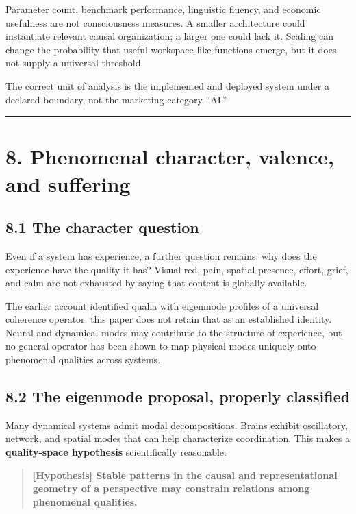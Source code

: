 \documentclass[
  11pt,
]{article}
\begin{document}
Parameter count, benchmark performance, linguistic fluency, and economic
usefulness are not consciousness measures. A smaller architecture could
instantiate relevant causal organization; a larger one could lack it.
Scaling can change the probability that useful workspace-like functions
emerge, but it does not supply a universal threshold.

The correct unit of analysis is the implemented and deployed system
under a declared boundary, not the marketing category ``AI.''

\begin{center}\rule{0.5\linewidth}{0.5pt}\end{center}

\section{8. Phenomenal character, valence, and
suffering}\label{phenomenal-character-valence-and-suffering}

\subsection{8.1 The character question}\label{the-character-question}

Even if a system has experience, a further question remains: why does
the experience have the quality it has? Visual red, pain, spatial
presence, effort, grief, and calm are not exhausted by saying that
content is globally available.

The earlier account identified qualia with eigenmode profiles of a
universal coherence operator. this paper does not retain that as an
established identity. Neural and dynamical modes may contribute to the
structure of experience, but no general operator has been shown to map
physical modes uniquely onto phenomenal qualities across systems.

\subsection{8.2 The eigenmode proposal, properly
classified}\label{the-eigenmode-proposal-properly-classified}

Many dynamical systems admit modal decompositions. Brains exhibit
oscillatory, network, and spatial modes that can help characterize
coordination. This makes a \textbf{quality-space hypothesis}
scientifically reasonable:

\begin{quote}
\textbf{{[}Hypothesis{]} Stable patterns in the causal and
representational geometry of a perspective may constrain relations among
phenomenal qualities.}
\end{quote}
\end{document}
